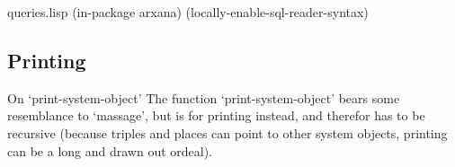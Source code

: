 \begin{common}{queries.lisp}
(in-package arxana)
(locally-enable-sql-reader-syntax)
\end{common}

\subsection*{Printing}

\begin{notate}{On `print-system-object'} \label{print-system-object}
The function `print-system-object' bears some resemblance
to `massage', but is for printing instead,
and therefor has to be recursive (because triples and
places can point to other system objects, printing can be
a long and drawn out ordeal).
\end{notate}

